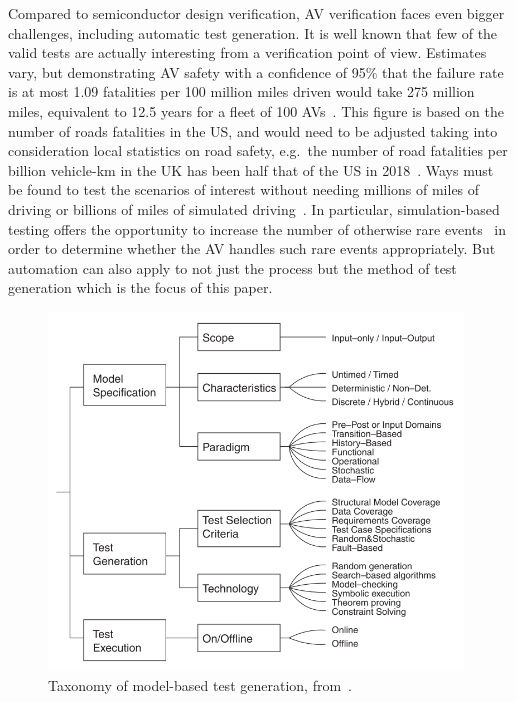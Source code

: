 \documentclass[runningheads,a4paper]{llncs}
\begin{document}
Compared to semiconductor design verification, AV verification faces even bigger challenges, including automatic test generation. It is well known that few of the valid tests are actually interesting from a verification point of view. Estimates vary, but demonstrating AV safety with a confidence of 95\% that the failure rate is at most 1.09 fatalities per 100 million miles driven would take 275 million miles, equivalent to 12.5 years for a fleet of 100 AVs~\cite{kalra2016driving}. This figure is based on the number of roads fatalities in the US, and would need to be adjusted taking into consideration local statistics on road safety, e.g.\ the number of road fatalities per billion vehicle-km in the UK has been half that of the US in 2018~\cite{ITFroadSafety2018}. Ways must be found to test the scenarios of interest without needing millions of miles of driving or billions of miles of simulated driving~\cite{korosec2019waymo}. In particular, simulation-based testing offers the opportunity to increase the number of otherwise rare events~\cite{Koopman2018} in order to determine whether the AV handles such rare events appropriately. But automation can also apply to not just the process but the method of test generation which is the focus of this paper.


\begin{figure}[!t]
	\centering
\includegraphics[width=0.98\textwidth]{taxonomy.png}
	\caption{Taxonomy of model-based test generation, from~\cite{utting2012taxonomy}.}
	\label{f:taxonomy}
\end{figure}
\end{document}
